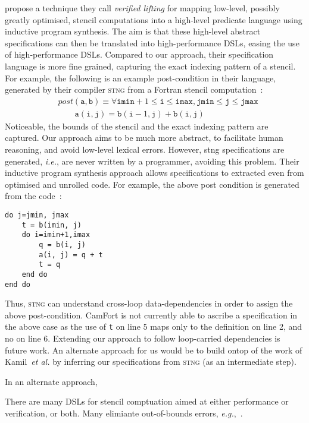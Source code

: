 \documentclass[9pt]{sigplanconf}
\theoremstyle{definition}
\newcommand{\ie}{\emph{i.e.}}
\newcommand{\eg}{\emph{e.g.}}
\begin{document}
\citet{kamil2016verified} propose a technique they call
\emph{verified lifting} for mapping low-level, possibly
greatly optimised, stencil computations into a high-level
predicate language using inductive program synthesis.
The aim is that these high-level abstract specifications can
then be translated into high-performance DSLs, easing the
use of high-performance DSLs. Compared to our approach,
their specification language is more fine grained, capturing
the exact indexing pattern of a stencil. For example, the following
is an example post-condition in their language, generated by their
compiler \textsc{stng} from a Fortran stencil computation~\cite [p.3]{kamil2016verified}:
%
\begin{align*}
& \textit{post}(\texttt{a}, \texttt{b}) \equiv \forall \texttt{imin}+1
\leq \texttt{i} \leq \texttt{imax}, \texttt{jmin} \leq \texttt{j} \leq
\texttt{jmax} \\
& \qquad \texttt{a}(\texttt{i},\texttt{j}) =
\texttt{b}(\texttt{i}-1,\texttt{j}) + \texttt{b}(\texttt{i},\texttt{j})
\end{align*}
%
Noticeable, the bounds of the stencil and the exact indexing pattern
are captured. Our approach aims to be much more abstract, to
facilitate human reasoning, and avoid low-level lexical
errors. However, \textsf{stng} specifications are generated, \ie{},
are never written by a programmer, avoiding this
problem. Their inductive program synthesis approach allows
specifications to extracted even from optimised and unrolled code. For
example, the above post condition is generated from the code~\cite [p.3]{kamil2016verified}:
%
\begin{verbatim}
do j=jmin, jmax
    t = b(imin, j)
    do i=imin+1,imax
        q = b(i, j)
        a(i, j) = q + t
        t = q
    end do
end do
\end{verbatim}
%
Thus, \textsc{stng} can understand cross-loop data-dependencies
in order to assign the above post-condition. CamFort is not currently
able to ascribe a specification in the above case as the use of
\texttt{t} on line 5 maps only to the definition on line 2, and no on
line 6. Extending our approach to follow loop-carried dependencies is
future work. An alternate approach for us would be to build ontop of
the work of Kamil~\emph{et al.} by inferring our specifications from
\textsc{stng} (as an intermediate step).

In an alternate approach,~\citet{abe2013model}

There are many DSLs for stencil comptuation aimed at either
performance or verification, or both. Many elimiante out-of-bounds
errors, \eg{},~\cite{DBLP:journals/corr/abs-1109-0777}.





\onecolumn
\appendix


\end{document}
